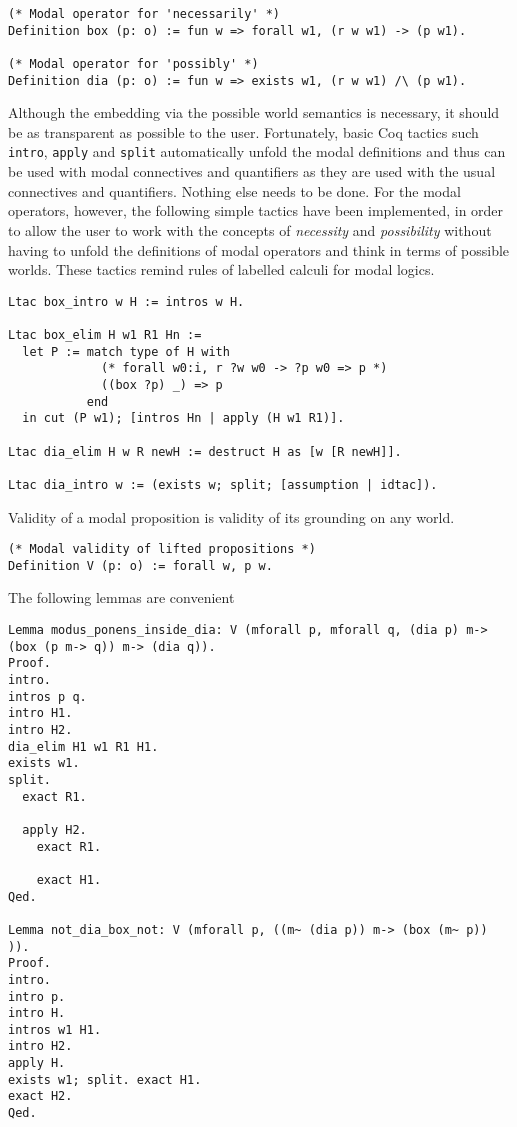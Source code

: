 \documentclass{llncs}
\begin{document}
\begin{verbatim}
(* Modal operator for 'necessarily' *)
Definition box (p: o) := fun w => forall w1, (r w w1) -> (p w1).

(* Modal operator for 'possibly' *)
Definition dia (p: o) := fun w => exists w1, (r w w1) /\ (p w1).
\end{verbatim}


\noindent
Although the embedding via the possible world semantics is necessary, it should be as transparent as possible to the user. Fortunately, basic Coq tactics such \texttt{intro}, \texttt{apply} and \texttt{split} automatically unfold the modal definitions and thus can be used with modal connectives and quantifiers as they are used with the usual connectives and quantifiers. Nothing else needs to be done. For the modal operators, however, the following simple tactics have been implemented, in order to allow the user to work with the concepts of \emph{necessity} and \emph{possibility} without having to unfold the definitions of modal operators and think in terms of possible worlds. These tactics remind rules of labelled calculi for modal logics.


\begin{verbatim}
Ltac box_intro w H := intros w H.

Ltac box_elim H w1 R1 Hn := 
  let P := match type of H with
             (* forall w0:i, r ?w w0 -> ?p w0 => p *)
             ((box ?p) _) => p
           end
  in cut (P w1); [intros Hn | apply (H w1 R1)].

Ltac dia_elim H w R newH := destruct H as [w [R newH]].

Ltac dia_intro w := (exists w; split; [assumption | idtac]).
\end{verbatim}


\noindent
Validity of a modal proposition is validity of its grounding on any world.

\begin{verbatim}
(* Modal validity of lifted propositions *)
Definition V (p: o) := forall w, p w.
\end{verbatim}

\noindent
The following lemmas are convenient 

\begin{verbatim}
Lemma modus_ponens_inside_dia: V (mforall p, mforall q, (dia p) m-> (box (p m-> q)) m-> (dia q)).
Proof.
intro.
intros p q.
intro H1.
intro H2.
dia_elim H1 w1 R1 H1.
exists w1.
split.
  exact R1.

  apply H2. 
    exact R1.

    exact H1.
Qed.

Lemma not_dia_box_not: V (mforall p, ((m~ (dia p)) m-> (box (m~ p)) )).
Proof.
intro.
intro p.
intro H.
intros w1 H1.
intro H2.
apply H.
exists w1; split. exact H1.
exact H2.
Qed.
\end{verbatim}
\end{document}
